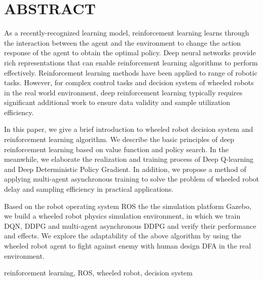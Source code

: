 ﻿%
%
%

%
%
\renewcommand{\baselinestretch}{1.5}
\fontsize{12pt}{13pt}\selectfont
\setmainfont{Times New Roman}
\chapter*{\bf{ABSTRACT}}
As a recently-recognized learning model, reinforcement learning learns through the interaction between the agent and the environment to change the action response of the agent to obtain the optimal policy. Deep neural networks provide rich representations that can enable reinforcement learning algorithms to perform effectively. Reinforcement learning methods have been applied to range of robotic tasks. However, for complex control tasks and decision system of wheeled robots in the real world environment, deep reinforcement learning typically requires significant additional work to ensure data validity and sample utilization efficiency.

In this paper, we give a brief introduction to wheeled robot decision system and reinforcement learning algorithm. We describe the basic principles of deep reinforcement learning based on value function and policy search. In the meanwhile, we elaborate the realization and training process of Deep Q-learning and Deep Deterministic Policy Gradient. In addition, we propose a method of applying multi-agent asynchronous training to solve the problem of wheeled robot delay and sampling efficiency in practical applications.

Based on the robot operating system ROS the the simulation platform Gazebo, we build a wheeled robot physics simulation environment, in which we train DQN, DDPG and multi-agent asynchronous DDPG and verify their performance and effects. We explore the adaptability of the above algorithm by using the wheeled robot agent to fight against enemy with human design DFA in the real environment.

\vspace{1em}
 \quad reinforcement learning, ROS, wheeled robot, decision system
